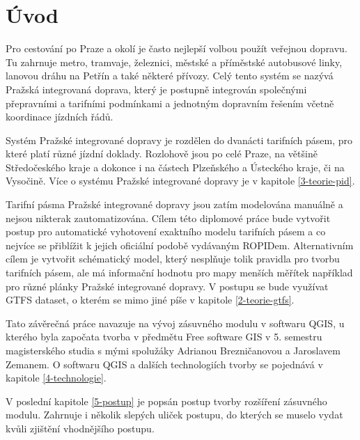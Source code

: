 \chapter*{Úvod}
\label{0-uvod}

Pro cestování po Praze a okolí je často nejlepší volbou použít veřejnou dopravu.
Tu zahrnuje metro, tramvaje, železnici, městské a příměstské autobusové linky,
lanovou dráhu na Petřín a také některé přívozy. Celý tento systém se nazývá 
Pražská integrovaná doprava, který je postupně integrován společnými přepravními
a tarifními podmínkami a jednotným dopravním řešením včetně koordinace jízdních řádů.

Systém Pražské integrované dopravy je rozdělen do dvanácti tarifních pásem, pro
které platí různé jízdní doklady. Rozlohově jsou po celé Praze, na většině
Středočeského kraje a dokonce i na částech Plzeňského a Ústeckého kraje, či na Vysočině.
Více o systému Pražské integrované dopravy je v kapitole \ref{3-teorie-pid}.

Tarifní pásma Pražské integrované dopravy jsou zatím modelována manuálně a nejsou
nikterak zautomatizována. Cílem této diplomové práce bude vytvořit postup pro
automatické vyhotovení exaktního modelu tarifních pásem a co nejvíce se přiblížit k jejich
oficiální podobě vydávaným ROPIDem. Alternativním cílem je vytvořit schématický model, který nesplňuje tolik
pravidla pro tvorbu tarifních pásem, ale má informační hodnotu pro mapy menších měřítek
například pro různé plánky Pražské integrované dopravy. V postupu se bude využívat GTFS 
dataset, o kterém se mimo jiné píše v kapitole \ref{2-teorie-gtfs}.

Tato závěrečná práce navazuje na vývoj zásuvného modulu
v softwaru QGIS, u kterého byla započata tvorba v předmětu Free software GIS
v 5. semestru magisterského studia s mými spolužáky Adrianou Brezničanovou a Jaroslavem
Zemanem. O softwaru QGIS a dalších technologiích tvorby se pojednává v kapitole 
\ref{4-technologie}.

V poslední kapitole \ref{5-postup} je popsán postup tvorby rozšíření zásuvného modulu.
Zahrnuje i několik slepých uliček postupu, do kterých se muselo vydat kvůli zjištění
vhodnějšího postupu.    



